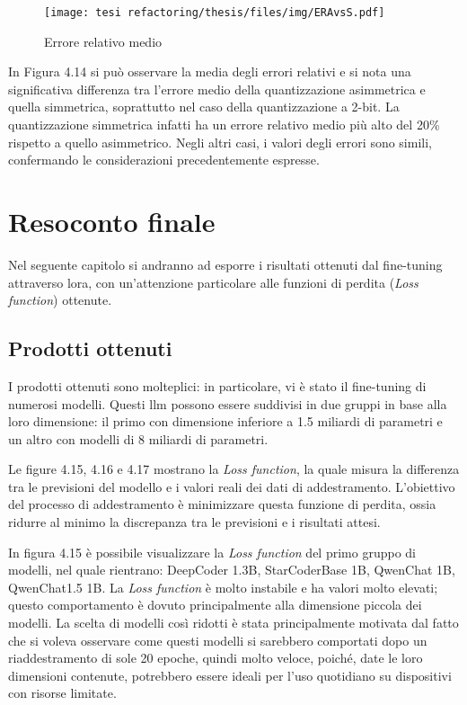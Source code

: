     \begin{figure}[htp]
        \centering        
        \texttt{[image: tesi refactoring/thesis/files/img/ERAvsS.pdf]}
        \caption{Errore relativo medio}
    \end{figure}  

    In Figura 4.14 si può osservare la media degli errori relativi e si nota una significativa differenza tra l’errore medio della quantizzazione asimmetrica e quella simmetrica, soprattutto nel caso della quantizzazione a 2-bit. La quantizzazione simmetrica infatti ha un errore relativo medio più alto del 20\% rispetto a quello asimmetrico. Negli altri casi, i valori degli errori sono simili, confermando le considerazioni precedentemente espresse.
    
    
\section{Resoconto finale}
Nel seguente capitolo si andranno ad esporre i risultati ottenuti dal fine-tuning attraverso \gls{lora}, con un'attenzione particolare alle funzioni di perdita (\textit{Loss function}) ottenute.
    \subsection{Prodotti ottenuti}
    I prodotti ottenuti sono molteplici: in particolare, vi è stato il \gls{fine-tuning} di numerosi modelli.
    Questi \gls{llm} possono essere suddivisi in due gruppi in base alla loro dimensione: il primo con dimensione inferiore a 1.5 miliardi di parametri e un altro con modelli di 8 miliardi di parametri.


    Le figure 4.15, 4.16 e 4.17 mostrano la \textit{Loss function}, la quale misura la differenza tra le previsioni del modello e i valori reali dei dati di addestramento. L'obiettivo del processo di addestramento è minimizzare questa funzione di perdita, ossia ridurre al minimo la discrepanza tra le previsioni e i risultati attesi.

        
    In figura 4.15 è possibile visualizzare la \textit{Loss function} del primo gruppo di modelli, nel quale rientrano: DeepCoder 1.3B, StarCoderBase 1B, QwenChat 1B, QwenChat1.5 1B.
    La \textit{Loss function} è molto instabile e ha valori molto elevati; questo comportamento è dovuto principalmente alla dimensione piccola dei modelli.
    La scelta di modelli così ridotti è stata principalmente motivata dal fatto che si voleva osservare come questi modelli si sarebbero comportati dopo un riaddestramento di sole 20 epoche, quindi molto veloce, poiché, date le loro dimensioni contenute, potrebbero essere ideali per l'uso quotidiano su dispositivi con risorse limitate.
    
